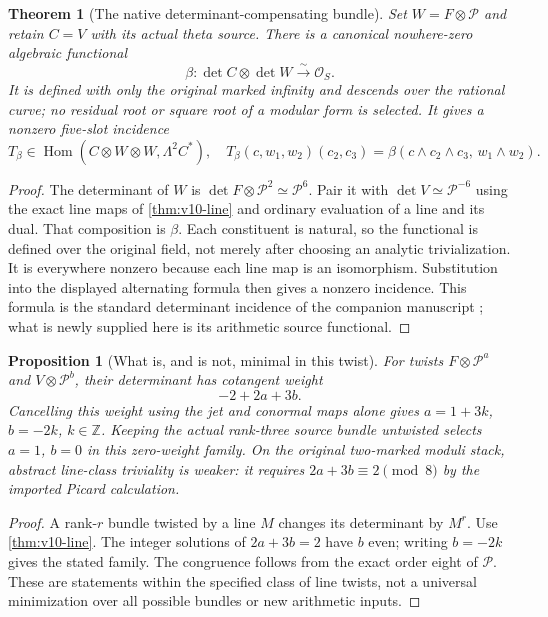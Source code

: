 \documentclass[11pt]{article}
\newtheorem{theorem}{Theorem}[section]
\newtheorem{proposition}[proposition]{Proposition}
\theoremstyle{definition}
\theoremstyle{remark}
\newcommand{\Z}{\mathbb Z}
\begin{document}
\begin{theorem}[The native determinant-compensating bundle]
\label{thm:v10-beta}
Set $W=F\otimes\mathscr P$ and retain $C=V$ with its actual theta
source. There is a canonical nowhere-zero algebraic functional
\begin{equation}
 \boxed{\beta:\det C\otimes\det W\xrightarrow{\sim}\mathcal O_S.}
 \label{eq:v10-beta}
\end{equation}
It is defined with only the original marked infinity and descends over the
rational curve; no residual root or square root of a modular form is
selected. It gives a nonzero five-slot incidence
\begin{equation}
 T_\beta\in\operatorname{Hom}
 (C\otimes W\otimes W,\Lambda^2C^*),
 \quad
 T_\beta(c,w_1,w_2)(c_2,c_3)
 =\beta(c\wedge c_2\wedge c_3,\,w_1\wedge w_2).
 \label{eq:v10-incidence}
\end{equation}
\end{theorem}
\begin{proof}
The determinant of $W$ is
$\det F\otimes\mathscr P^2\simeq\mathscr P^6$.
Pair it with $\det V\simeq\mathscr P^{-6}$ using the exact line maps
of \cref{thm:v10-line} and ordinary evaluation of a line and its dual.
That composition is $\beta$. Each constituent is natural, so the
functional is defined over the original field, not merely after choosing
an analytic trivialization. It is everywhere nonzero because each line
map is an isomorphism. Substitution into the displayed alternating formula
then gives a nonzero incidence. This formula is the standard determinant
incidence of the companion manuscript \cite{Duality}; what is newly
supplied here is its arithmetic source functional.
\end{proof}

\begin{proposition}[What is, and is not, minimal in this twist]
\label{prop:v10-twist}
For twists $F\otimes\mathscr P^a$ and $V\otimes\mathscr P^b$,
their determinant has cotangent weight
\begin{equation}
 \boxed{-2+2a+3b.}\label{eq:v10-weight}
\end{equation}
Cancelling this weight using the jet and conormal maps alone gives
$a=1+3k$, $b=-2k$, $k\in\Z$. Keeping the actual rank-three source
bundle untwisted selects $a=1$, $b=0$ in this zero-weight family.
On the original two-marked moduli stack, abstract line-class triviality is
weaker: it requires $2a+3b\equiv2\pmod8$ by the imported Picard calculation.
\end{proposition}
\begin{proof}
A rank-$r$ bundle twisted by a line $M$ changes its determinant by $M^r$.
Use \cref{thm:v10-line}. The integer solutions of $2a+3b=2$ have $b$
even; writing $b=-2k$ gives the stated family. The congruence follows from
the exact order eight of $\mathscr P$. These are statements within the
specified class of line twists, not a universal minimization over all
possible bundles or new arithmetic inputs.
\end{proof}
\end{document}
